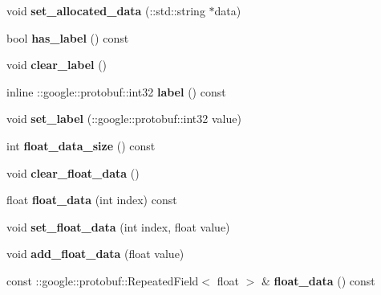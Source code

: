 \begin{DoxyCompactItemize}
void {\bfseries set\+\_\+allocated\+\_\+data} (\+::std\+::string $\ast$data)
\item 
\mbox{\label{classcaffe_1_1_datum_a0406531bf13d4b49cb4eac1492b9931a}} 
bool {\bfseries has\+\_\+label} () const
\item 
\mbox{\label{classcaffe_1_1_datum_a57debbf6b3293bfb226b9218f06401b7}} 
void {\bfseries clear\+\_\+label} ()
\item 
\mbox{\label{classcaffe_1_1_datum_a1e83e22c7c6cce72d117a6fc9baa5ce0}} 
inline \+::google\+::protobuf\+::int32 {\bfseries label} () const
\item 
\mbox{\label{classcaffe_1_1_datum_adba89fb8e6bedf629c910a9bf5ca38f0}} 
void {\bfseries set\+\_\+label} (\+::google\+::protobuf\+::int32 value)
\item 
\mbox{\label{classcaffe_1_1_datum_a992145b0c6b50cb6138ed5f3a30e96cd}} 
int {\bfseries float\+\_\+data\+\_\+size} () const
\item 
\mbox{\label{classcaffe_1_1_datum_a461988d05f145f5000f829f593f34c4e}} 
void {\bfseries clear\+\_\+float\+\_\+data} ()
\item 
\mbox{\label{classcaffe_1_1_datum_a9882968d04bb5ae1776e8276b266ddbb}} 
float {\bfseries float\+\_\+data} (int index) const
\item 
\mbox{\label{classcaffe_1_1_datum_a034af26948237c5f6c29e97a8f04482f}} 
void {\bfseries set\+\_\+float\+\_\+data} (int index, float value)
\item 
\mbox{\label{classcaffe_1_1_datum_a214ae2f07fadaaa8015db8193322a56c}} 
void {\bfseries add\+\_\+float\+\_\+data} (float value)
\item 
\mbox{\label{classcaffe_1_1_datum_ac5537fdd2b31c756280f9c0f31e47670}} 
const \+::google\+::protobuf\+::\+Repeated\+Field$<$ float $>$ \& {\bfseries float\+\_\+data} () const
\item 
\mbox{\label{classcaffe_1_1_datum_aa71a646db767371cc0f8f17b409971e7}} 

\end{DoxyCompactItemize}
